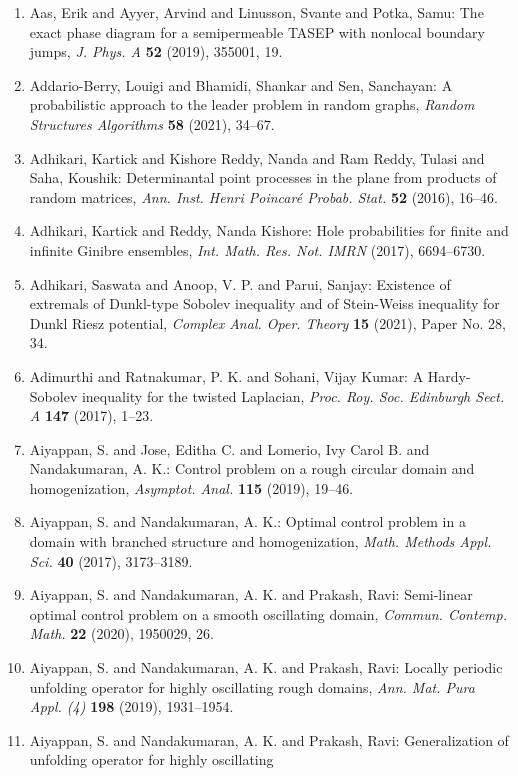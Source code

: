 \begin{enumerate}
\item Aas, Erik and Ayyer, Arvind and Linusson, Svante and Potka,
Samu: The exact phase diagram for a semipermeable {TASEP} with
nonlocal boundary jumps, \emph{J. Phys. A} {\bf 52} (2019), 355001, 19.
\item Addario-Berry, Louigi and Bhamidi, Shankar and Sen, Sanchayan: A probabilistic approach to the leader problem in random
graphs, \emph{Random Structures Algorithms} {\bf 58} (2021), 34--67.
\item Adhikari, Kartick and Kishore Reddy, Nanda and Ram Reddy,
Tulasi and Saha, Koushik: Determinantal point processes in the plane from products of
random matrices, \emph{Ann. Inst. Henri Poincar\'{e} Probab. Stat.} {\bf 52} (2016), 16--46.
\item Adhikari, Kartick and Reddy, Nanda Kishore: Hole probabilities for finite and infinite {G}inibre
ensembles, \emph{Int. Math. Res. Not. IMRN} {\bf } (2017), 6694--6730.
\item Adhikari, Saswata and Anoop, V. P. and Parui, Sanjay: Existence of extremals of {D}unkl-type {S}obolev inequality
and of {S}tein-{W}eiss inequality for {D}unkl {R}iesz
potential, \emph{Complex Anal. Oper. Theory} {\bf 15} (2021), Paper No. 28, 34.
\item Adimurthi and Ratnakumar, P. K. and Sohani, Vijay Kumar: A {H}ardy-{S}obolev inequality for the twisted {L}aplacian, \emph{Proc. Roy. Soc. Edinburgh Sect. A} {\bf 147} (2017), 1--23.
\item Aiyappan, S. and Jose, Editha C. and Lomerio, Ivy Carol B. and
Nandakumaran, A. K.: Control problem on a rough circular domain and homogenization, \emph{Asymptot. Anal.} {\bf 115} (2019), 19--46.
\item Aiyappan, S. and Nandakumaran, A. K.: Optimal control problem in a domain with branched structure
and homogenization, \emph{Math. Methods Appl. Sci.} {\bf 40} (2017), 3173--3189.
\item Aiyappan, S. and Nandakumaran, A. K. and Prakash, Ravi: Semi-linear optimal control problem on a smooth oscillating
domain, \emph{Commun. Contemp. Math.} {\bf 22} (2020), 1950029, 26.
\item Aiyappan, S. and Nandakumaran, A. K. and Prakash, Ravi: Locally periodic unfolding operator for highly oscillating
rough domains, \emph{Ann. Mat. Pura Appl. (4)} {\bf 198} (2019), 1931--1954.
\item Aiyappan, S. and Nandakumaran, A. K. and Prakash, Ravi: Generalization of unfolding operator for highly oscillating

\end{enumerate}
